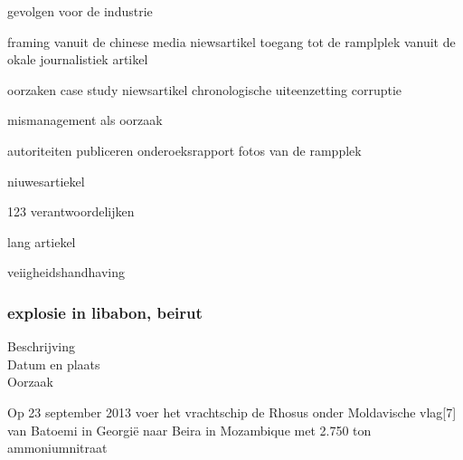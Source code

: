 \cite{hartley13082015videofootage}
\cite{odonnel01062017firetanjinblast2015}
gevolgen voor de industrie

\cite{fan15082015newyorkermistrustchina}
framing vanuit de chinese media
\cite{yanlidongchinamediaframingTanjin}
\cite{evans27092017TnjinInsurance}
niewsartikel
\cite{jasi26032019chineschemplant}
\cite{shiqingTanjinExecutiveSentence}
toegang tot de ramplplek vanuit de okale journalistiek
\cite{sophiebeach15082015}
artikel

\cite{hamzeh05082020BeirutBlast}
\cite{chemwatch18082015TanjiinExplosion}
\cite{thehindu15062019chinaExplosion}
\cite{santagotimes24032019chinablast}
oorzaken
\cite{klingecorp28042020causedTanjin}
case study
\cite{mcgarryExplosions2017}
niewsartikel
\cite{roswnfeld13082015TanjinReports}
chronologische uiteenzetting
\cite{aria12082015explosionaTanjin}
corruptie

mismanagement als oorzaak

autoriteiten publiceren onderoeksrapport
\cite{tremblay11022016chineseInvestigatorsTanjin}
fotos van de rampplek
\cite{taylor13082015TanjinExplosianAftermath}

niuwesartiekel
\cite{associatedPresss13082013}

\cite{un20082015InvestigationTanjin}
\cite{france2412082015TnjinExplosion}
\cite{npr14082015TanjinCause}
123 verantwoordelijken
\cite{bbc05022016TanjinResponsibles}

lang artiekel
\cite{CBodeen15082015TanjinExplosion}

\cite{reutersTanjinInsurance}
\cite{yu082016evaluationTanjin2015}
\cite{wiki2015TanjinExplosions}
\cite{bbc17082015whathappenedTanjin}
\cite{mortimer19082016taijinexplosioncrater}
veiigheidshandhaving
\cite{internationallabourofficeChmControlTooliit}

\cite{euTaxationCustomsICSC}
\cite{iloWHOChemSafetyCards}

\subsubsection{explosie in libabon, beirut }
\begin{description}
\item[Beschrijving]
\item[Datum en plaats] 
\item[Oorzaak]
\end{description}
Op 23 september 2013 voer het vrachtschip de Rhosus onder Moldavische vlag[7] van Batoemi in Georgië naar Beira in Mozambique met 2.750 ton ammoniumnitraat

